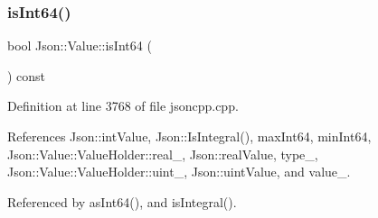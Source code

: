 \subsubsection{\texorpdfstring{is\+Int64()}{isInt64()}}
{\footnotesize\ttfamily bool Json\+::\+Value\+::is\+Int64 (\begin{DoxyParamCaption}{ }\end{DoxyParamCaption}) const}



Definition at line 3768 of file jsoncpp.\+cpp.



References Json\+::int\+Value, Json\+::\+Is\+Integral(), max\+Int64, min\+Int64, Json\+::\+Value\+::\+Value\+Holder\+::real\+\_\+, Json\+::real\+Value, type\+\_\+, Json\+::\+Value\+::\+Value\+Holder\+::uint\+\_\+, Json\+::uint\+Value, and value\+\_\+.



Referenced by as\+Int64(), and is\+Integral().


